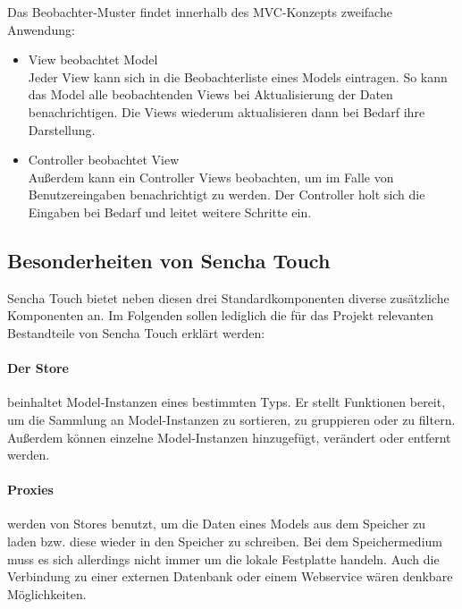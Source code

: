 Das Beobachter-Muster findet innerhalb des MVC-Konzepts zweifache Anwendung:
\begin{itemize}
	\item View beobachtet Model\\
	Jeder View kann sich in die Beobachterliste eines Models eintragen. So kann das Model alle beobachtenden Views bei Aktualisierung der Daten benachrichtigen. Die Views wiederum aktualisieren dann bei Bedarf ihre Darstellung.
	\item Controller beobachtet View\\
	Außerdem kann ein Controller Views beobachten, um im Falle von Benutzereingaben benachrichtigt zu werden. Der Controller holt sich die Eingaben bei Bedarf und leitet weitere Schritte ein.
\end{itemize}

\subsection{Besonderheiten von Sencha Touch}

Sencha Touch bietet neben diesen drei Standardkomponenten diverse zusätzliche Komponenten an. Im Folgenden sollen lediglich die für das Projekt relevanten Bestandteile von Sencha Touch erklärt werden:

\paragraph{Der Store} beinhaltet Model-Instanzen eines bestimmten Typs. Er stellt Funktionen bereit, um die Sammlung an Model-Instanzen zu sortieren, zu gruppieren oder zu filtern. Außerdem können einzelne Model-Instanzen hinzugefügt, verändert oder entfernt werden.

\paragraph{Proxies }werden von Stores benutzt, um die Daten eines Models aus dem Speicher zu laden bzw. diese wieder in den Speicher zu schreiben. Bei dem Speichermedium muss es sich allerdings nicht immer um die lokale Festplatte handeln. Auch die Verbindung zu einer externen Datenbank oder einem Webservice wären denkbare Möglichkeiten.

